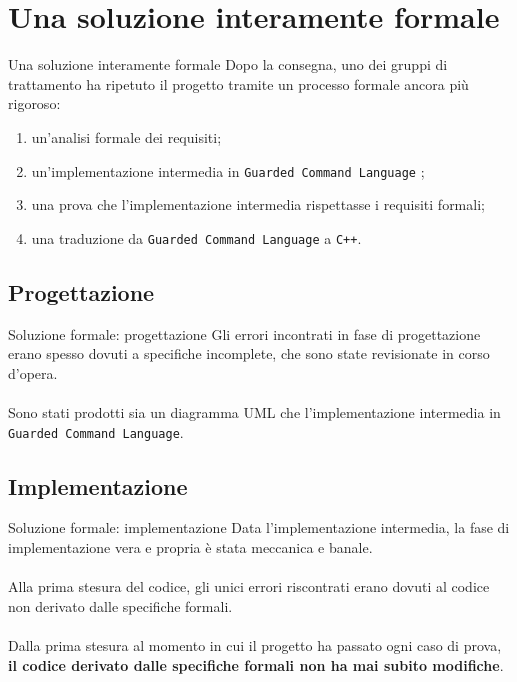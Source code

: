 \documentclass{beamer}
\begin{document}
\section{Una soluzione interamente formale}

\begin{frame}{Una soluzione interamente formale}
	Dopo la consegna, uno dei gruppi di trattamento ha ripetuto il progetto
	tramite un processo formale ancora più rigoroso:
	\begin{enumerate}
		\item un'analisi formale dei requisiti;
		\item un'implementazione intermedia in \texttt{Guarded Command Language}
		      \autocite{cohen};
		\item una prova che l'implementazione intermedia rispettasse i requisiti
		      formali;
		\item una traduzione da \texttt{Guarded Command Language} a \texttt{C++}.
	\end{enumerate}
\end{frame}

\subsection{Progettazione}
\begin{frame}{Soluzione formale: progettazione}
	Gli errori incontrati in fase di progettazione erano spesso dovuti a
	specifiche incomplete, che sono state revisionate in corso d'opera.
	\\~\\
	Sono stati prodotti sia un diagramma UML che l'implementazione intermedia in
	\texttt{Guarded Command Language}.
\end{frame}

\subsection{Implementazione}
\begin{frame}{Soluzione formale: implementazione}
	Data l'implementazione intermedia, la fase di implementazione vera e propria
	è stata meccanica e banale.
	\\~\\
	Alla prima stesura del codice, gli unici errori riscontrati erano dovuti al
	codice non derivato dalle specifiche formali.
	\\~\\
	Dalla prima stesura al momento in cui il progetto ha passato ogni caso di
	prova, \textbf{il codice derivato dalle specifiche formali non ha mai subito
		modifiche}.
\end{frame}
\end{document}
